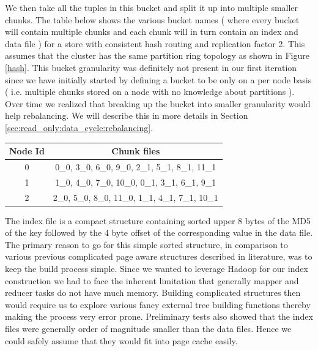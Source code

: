 \documentclass[10pt,twocolumn,preprint,natbib,authoryear]{sigplanconf}
\begin{document}
We then take all the tuples in this bucket and split it up into multiple smaller chunks. The table below shows the various bucket names ( where every bucket will contain multiple chunks and each chunk will in turn contain an index and data file ) for a store with consistent hash routing and replication factor 2. This assumes that the cluster has the same partition ring topology as shown in Figure \ref{hash}. This bucket granularity was definitely not present in our first iteration since we have initially started by defining a bucket to be only on a per node basis ( i.e. multiple chunks stored on a node with no knowledge about partitions ). Over time we realized that breaking up the bucket into smaller granularity would help rebalancing. We will describe this in more details in Section \ref{sec:read_only:data_cycle:rebalancing}. 

\begin{center}
    \begin{tabular}{ | c | c | }
    \hline
    Node Id & Chunk files \\ \hline
    0 &  0\_0, 3\_0, 6\_0, 9\_0,      2\_1, 5\_1, 8\_1, 11\_1	\\
   1 &   1\_0, 4\_0, 7\_0, 10\_0,      0\_1, 3\_1, 6\_1, 9\_1		\\
   2 &    2\_0, 5\_0, 8\_0, 11\_0,    1\_1, 4\_1, 7\_1, 10\_1		\\
\hline
    \end{tabular}
\end{center}


The index file is a compact structure containing sorted upper 8 bytes of the MD5 of the key followed by the 4 byte offset of the corresponding value in the data file. The primary reason to go for this simple sorted structure, in comparison to various previous complicated page aware structures described in literature, was to keep the build process simple. Since we wanted to leverage Hadoop for our index construction we had to face the inherent limitation that generally mapper and reducer tasks do not have much memory. Building complicated structures then would require us to explore various fancy external tree building functions thereby making the process very error prone. Preliminary tests also showed that the index files were generally order of magnitude smaller than the data files. Hence we could safely assume that they would fit into page cache easily. 
\end{document}
